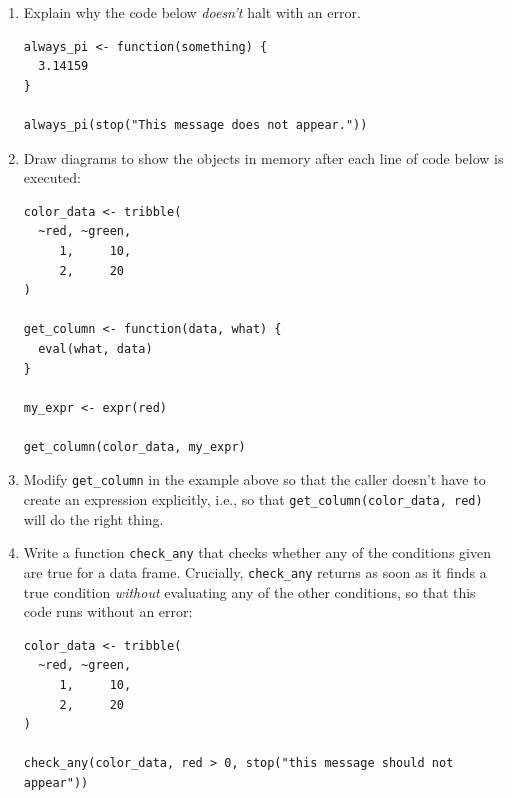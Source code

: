 \begin{enumerate}


\item
  Explain why the code below \emph{doesn't} halt with an error.

\begin{lstlisting}
always_pi <- function(something) {
  3.14159
}

always_pi(stop("This message does not appear."))
\end{lstlisting}

\item
  Draw diagrams to show the objects in memory
  after each line of code below is executed:

\begin{lstlisting}
color_data <- tribble(
  ~red, ~green,
     1,     10,
     2,     20
)

get_column <- function(data, what) {
  eval(what, data)
}

my_expr <- expr(red)

get_column(color_data, my_expr)
\end{lstlisting}

\item
  Modify \texttt{get\_column} in the example above so that
  the caller doesn't have to create an expression explicitly,
  i.e.,
  so that \texttt{get\_column(color\_data, red)} will do the right thing.

\item
  Write a function \texttt{check\_any}
  that checks whether any of the conditions given are true for a data frame.
  Crucially,
  \texttt{check\_any} returns as soon as it finds a true condition
  \emph{without} evaluating any of the other conditions,
  so that this code runs without an error:

\begin{lstlisting}
color_data <- tribble(
  ~red, ~green,
     1,     10,
     2,     20
)

check_any(color_data, red > 0, stop("this message should not appear"))
\end{lstlisting}

\end{enumerate}

